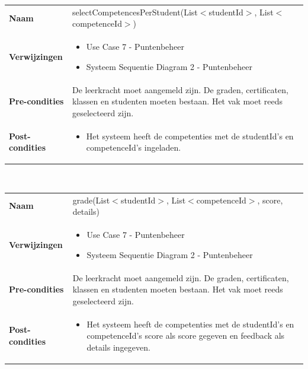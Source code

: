\documentclass[a4paper]{article}
\begin{document}
\begin{tabularx}{\textwidth}{|l X|}
    \hline
    \textbf{Naam} & selectCompetencesPerStudent(List$<$studentId$>$, List$<$competenceId$>$) \\
    \textbf{Verwijzingen} & \begin{itemize}[leftmargin=*]
        \item Use Case 7 - Puntenbeheer
        \item Systeem Sequentie Diagram 2 - Puntenbeheer
    \end{itemize}\\
    \textbf{Pre-condities} & De leerkracht moet aangemeld zijn. De graden, certificaten, klassen en studenten moeten bestaan. Het vak moet reeds geselecteerd zijn.\\
    \textbf{Post-condities} & \begin{itemize}[leftmargin=*]
        \item Het systeem heeft de competenties met de studentId's en competenceId's ingeladen.
    \end{itemize}\\
    \hline
\end{tabularx}\\

\begin{tabularx}{\textwidth}{|l X|}
    \hline
    \textbf{Naam} & grade(List$<$studentId$>$, List$<$competenceId$>$, score, details) \\
    \textbf{Verwijzingen} & \begin{itemize}[leftmargin=*]
        \item Use Case 7 - Puntenbeheer
        \item Systeem Sequentie Diagram 2 - Puntenbeheer
    \end{itemize}\\
    \textbf{Pre-condities} & De leerkracht moet aangemeld zijn. De graden, certificaten, klassen en studenten moeten bestaan. Het vak moet reeds geselecteerd zijn.\\
    \textbf{Post-condities} & \begin{itemize}[leftmargin=*]
        \item Het systeem heeft de competenties met de studentId's en competenceId's score als score gegeven en feedback als details ingegeven.
    \end{itemize}\\
    \hline
\end{tabularx}\\
\end{document}
